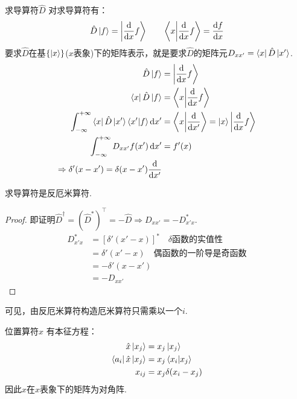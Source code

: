 \begin{extension}{求导算符$\hat{D}$}
    对求导算符有：
    \[\hat{D}\ket{f}=\ket{\frac{\dd}{\dd x} f} \qquad \braket{x}{\frac{\dd}{\dd x}f}=\frac{\dd f}{\dd x}\]
    要求$\hat{D}$在基$\{\ket{x}\}$($x$表象)下的矩阵表示，就是要求$\hat{D}$的矩阵元$D_{xx'} = \bra{x}\hat{D}\ket{x'}$.
    \begin{align*}
        \hat{D}\ket{f} &= \ket{\frac{\dd}{\dd x}f} \\
        \bra{x}\hat{D}\ket{f} &= \bra{x}\ket{\frac{\dd}{\dd x} f} \\
        \int_{-\infty}^{+\infty}\bra{x}\hat{D}\ket{x'}\bra{x'}\ket{f} \dd{x'} &= \bra{x}\ket{\frac{\dd}{\dd{x'}}} = \ket{x}\ket{\frac{\dd}{\dd x} f} \\
        \int_{-\infty}^{+\infty} D_{xx'} f(x') \dd{x'} &= f'(x) \\
        \Rightarrow \delta'(x-x') = \delta(x-x')\frac{\dd}{\dd{x'}}
    \end{align*}
\end{extension}
\begin{proposition}
    求导算符是反厄米算符.
\end{proposition}
\begin{proof}
    即证明$\hat{D}^{\dagger} = (\hat{D}^{*})^{\top} = -\hat{D} \Rightarrow D_{xx'} = -D^*_{x'x}$.
    \begin{align*}
        D^*_{x'x} &=  [\delta ' (x'-x)]^* \quad \text{$\delta$函数的实值性}\\
        &= \delta ' (x'-x) \quad \text{偶函数的一阶导是奇函数} \\
        &= -\delta ' (x-x') \\
        &= -D_{xx'}
    \end{align*}
\end{proof}

可见，由反厄米算符构造厄米算符只需乘以一个$i$.

\begin{extension}{位置算符$\hat{x}$}
    有本征方程：
    \begin{align*}
        \hat{x}\ket{x_j} &= x_j \ket{x_j} \\
        \bra{a_i}\hat{x}\ket{x_j} &= x_j\braket{x_i}{x_j} \\
        x_{ij} &= x_j \delta(x_i - x_j)
    \end{align*}
    因此$x$在$x$表象下的矩阵为对角阵.
\end{extension}

